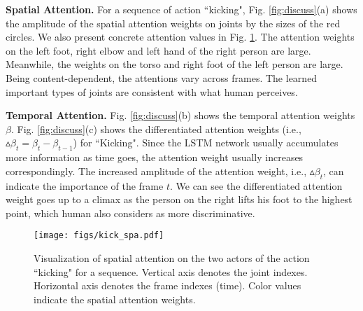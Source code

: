 \documentclass[letterpaper]{article}
\begin{document}
\textbf{Spatial Attention.} For a sequence of action ``kicking", Fig. \ref{fig:discuss}(a) shows the amplitude of the spatial attention weights on joints by the sizes of the red circles. We also present concrete attention values in Fig. \ref{fig:spa_att_vis}. The attention weights on the left foot, right elbow and left hand of the right person are large. Meanwhile, the weights on the torso and right foot of the left person are large. Being content-dependent, the attentions vary across frames. The learned important types of joints are consistent with what human perceives.


\textbf{Temporal Attention.} Fig. \ref{fig:discuss}(b) shows the temporal attention weights $\beta$. Fig. \ref{fig:discuss}(c) shows the differentiated attention weights (i.e., $\vartriangle\!\!\beta_t = \beta_t - \beta_{t-1}$) for ``Kicking". Since the LSTM network usually accumulates more information as time goes, the attention weight usually increases correspondingly. The increased amplitude of the attention weight, i.e., $\vartriangle\!\!\beta_t$, can indicate the importance of the frame $t$. We can see the differentiated attention weight goes up to a climax as the person on the right lifts his foot to the highest point, which human also considers as more discriminative.

\begin{figure}[t]
	\begin{center}
		\texttt{[image: figs/kick\_spa.pdf]}
\vspace{-4mm}
	\end{center}
\caption{Visualization of spatial attention on the two actors of the action ``kicking" for a sequence. Vertical axis denotes the joint indexes. Horizontal axis denotes the frame indexes (time). Color values indicate the spatial attention weights.}
\label{fig:spa_att_vis}
\vspace{1mm}
\end{figure}
\end{document}
